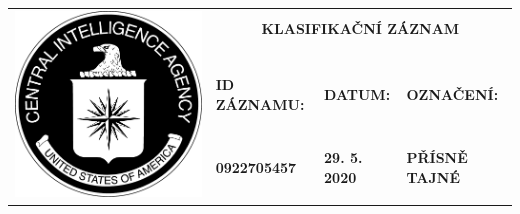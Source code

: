 \documentclass[a4paper, 11pt]{article}
\newcommand{\blackcell}{\cellcolor{black} \color{white} \ttfamily \bfseries}
\begin{document}
	\noindent
	\begin{table}[H]
		\renewcommand\tabularxcolumn[1]{m{#1}}
		\def\arraystretch{1.5}
		\begin{tabularx}{\textwidth}{l X X X}
			\multirow{4}{*}{ \includegraphics[scale=0.22]{sources/CIA_logo.pdf} } & \multicolumn{3}{c}{\bfseries \ttfamily \Huge KLASIFIKAČNÍ ZÁZNAM} \\
			&&&\\
			& \blackcell ID ZÁZNAMU: & \blackcell DATUM: & \blackcell OZNAČENÍ: \\
			& \blackcell 0922705457 & \blackcell 29. 5. 2020 & \blackcell PŘÍSNĚ TAJNÉ \\
			
		\end{tabularx}
	\end{table}
	
\end{document}
